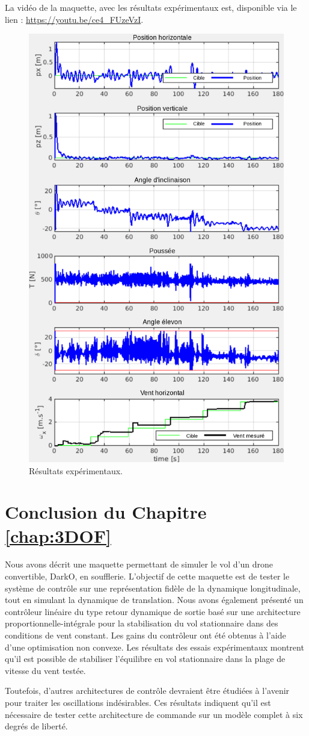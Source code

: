La vidéo de la maquette, avec les résultats expérimentaux est, disponible via le lien : \url{https://youtu.be/ce4_FUzeVzI}.

\begin{figure}[!ht]
   \centering
    \includegraphics[width=0.7\columnwidth]{figures/exp.png}
    \caption{Résultats expérimentaux.}
    \label{fig_exp_centrage_arr}
\end{figure}

\section{Conclusion du Chapitre \ref{chap:3DOF}}
Nous avons décrit une maquette permettant de simuler le vol d'un drone convertible, DarkO, en soufflerie. L'objectif de cette maquette est de tester le système de contrôle sur une représentation fidèle de la dynamique longitudinale, tout en simulant la dynamique de translation. Nous avons également présenté un contrôleur linéaire du type retour dynamique de sortie basé sur une architecture proportionnelle-intégrale pour la stabilisation du vol stationnaire dans des conditions de vent constant. Les gains du contrôleur ont été obtenus à l'aide d'une optimisation non convexe. Les résultats des essais expérimentaux montrent qu'il est possible de stabiliser l'équilibre en vol stationnaire dans la plage de vitesse du vent testée. 

Toutefois, d'autres architectures de contrôle devraient être étudiées à l'avenir pour traiter les oscillations indésirables. Ces résultats indiquent qu'il est nécessaire de tester cette architecture de commande sur un modèle complet à six degrés de liberté.
